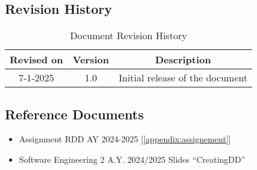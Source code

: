\subsection{Revision History}
\begin{table}[H]
    \centering
    \begin{tabular}{|c|c|c|}
        \hline
        \textbf{Revised on} & \textbf{Version} & \textbf{Description}\\ \hline
        7-1-2025 & 1.0     & Initial release of the document \\ \hline
    \end{tabular}
    \caption{Document Revision History}
    \label{tab:revision_history_table}
\end{table}

\subsection{Reference Documents}
\begin{itemize}
  \item Assignment RDD AY 2024-2025 [\ref{appendix:assignement}]
  \item Software Engineering 2 A.Y. 2024/2025 Slides “CreatingDD” 
\end{itemize}

